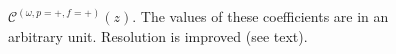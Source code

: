 \documentclass[]{report}
\begin{document}
\begin{figure}[H]
\begin{minipage}{.51\linewidth}
\end{minipage}%
\begin{minipage}{.51\linewidth}
\centering
{}
\end{minipage}
\caption{$ \mathcal{C}^{(\omega,p=+,f=+)}(z) $. The values of these coefficients are in an arbitrary unit. Resolution is improved (see text).}
\label{Cz_1}
\end{figure}
\end{document}
